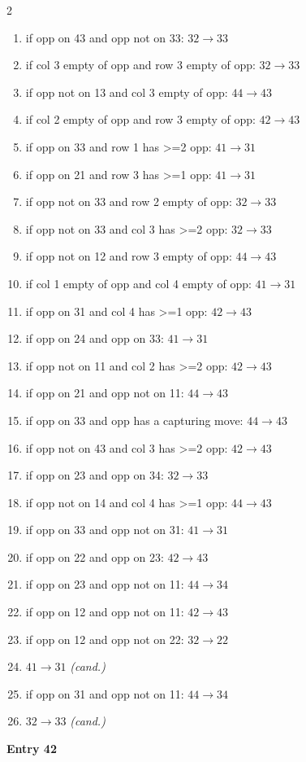 \begin{multicols}{2}
\begin{tikzpicture}[scale=0.24]
\end{tikzpicture}
\nopagebreak\begin{enumerate}[topsep=1pt,itemsep=0pt,parsep=0pt,leftmargin=2.2em,label=\arabic*.]
\item if opp on 43 and opp not on 33: $32\!\to\!33$
\item if col 3 empty of opp and row 3 empty of opp: $32\!\to\!33$
\item if opp not on 13 and col 3 empty of opp: $44\!\to\!43$
\item if col 2 empty of opp and row 3 empty of opp: $42\!\to\!43$
\item if opp on 33 and row 1 has >=2 opp: $41\!\to\!31$
\item if opp on 21 and row 3 has >=1 opp: $41\!\to\!31$
\item if opp not on 33 and row 2 empty of opp: $32\!\to\!33$
\item if opp not on 33 and col 3 has >=2 opp: $32\!\to\!33$
\item if opp not on 12 and row 3 empty of opp: $44\!\to\!43$
\item if col 1 empty of opp and col 4 empty of opp: $41\!\to\!31$
\item if opp on 31 and col 4 has >=1 opp: $42\!\to\!43$
\item if opp on 24 and opp on 33: $41\!\to\!31$
\item if opp not on 11 and col 2 has >=2 opp: $42\!\to\!43$
\item if opp on 21 and opp not on 11: $44\!\to\!43$
\item if opp on 33 and opp has a capturing move: $44\!\to\!43$
\item if opp not on 43 and col 3 has >=2 opp: $42\!\to\!43$
\item if opp on 23 and opp on 34: $32\!\to\!33$
\item if opp not on 14 and col 4 has >=1 opp: $44\!\to\!43$
\item if opp on 33 and opp not on 31: $41\!\to\!31$
\item if opp on 22 and opp on 23: $42\!\to\!43$
\item if opp on 23 and opp not on 11: $44\!\to\!34$
\item if opp on 12 and opp not on 11: $42\!\to\!43$
\item if opp on 12 and opp not on 22: $32\!\to\!22$
\item $41\!\to\!31$ \hfill\textit{(cand.)}
\item if opp on 31 and opp not on 11: $44\!\to\!34$
\item $32\!\to\!33$ \hfill\textit{(cand.)}
\end{enumerate}\smallskip
\noindent\textbf{Entry 42} \; 
\end{multicols}
